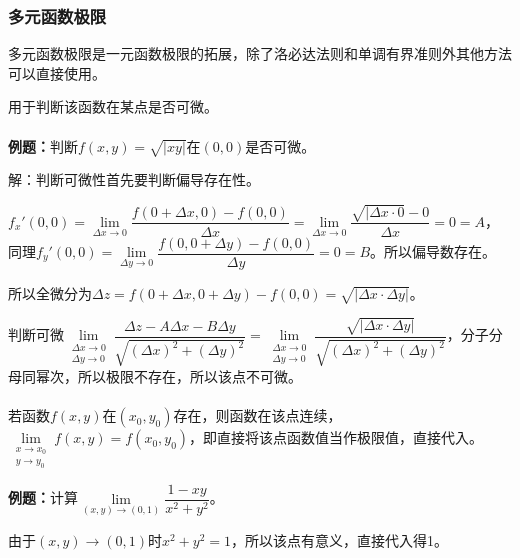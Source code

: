 \paragraph{}

\subsubsection{多元函数极限}

多元函数极限是一元函数极限的拓展，除了洛必达法则和单调有界准则外其他方法可以直接使用。

用于判断该函数在某点是否可微。

\paragraph{} \leavevmode \medskip

\textbf{例题：}判断$f(x,y)=\sqrt{\vert xy\vert}$在$(0,0)$是否可微。

解：判断可微性首先要判断偏导存在性。

$f_x'(0,0)=\lim\limits_{\Delta x\to0}\dfrac{f(0+\Delta x,0)-f(0,0)}{\Delta x}=\lim\limits_{\Delta x\to0}\dfrac{\sqrt{\vert\Delta x\cdot 0}-0}{\Delta x}=0=A$，同理$f_y'(0,0)=\lim\limits_{\Delta y\to0}\dfrac{f(0,0+\Delta y)-f(0,0)}{\Delta y}=0=B$。所以偏导数存在。

所以全微分为$\Delta z=f(0+\Delta x,0+\Delta y)-f(0,0)=\sqrt{\vert\Delta x\cdot\Delta y\vert}$。

判断可微$\lim\limits_{\substack{\Delta x\to0\\\Delta y\to0}}\dfrac{\Delta z-A\Delta x-B\Delta y}{\sqrt{(\Delta x)^2+(\Delta y)^2}}=\lim\limits_{\substack{\Delta x\to0\\\Delta y\to0}}\dfrac{\sqrt{\vert\Delta x\cdot\Delta y\vert}}{\sqrt{(\Delta x)^2+(\Delta y)^2}}$，分子分母同幂次，所以极限不存在，所以该点不可微。

\paragraph{}\leavevmode \medskip

若函数$f(x,y)$在$(x_0,y_0)$存在，则函数在该点连续，$\lim\limits_{\substack{x\to x_0\\ y\to y_0}}f(x,y)=f(x_0,y_0)$，即直接将该点函数值当作极限值，直接代入。

\textbf{例题：}计算$\lim\limits_{(x,y)\to(0,1)}\dfrac{1-xy}{x^2+y^2}$。

由于$(x,y)\to(0,1)$时$x^2+y^2=1$，所以该点有意义，直接代入得1。

